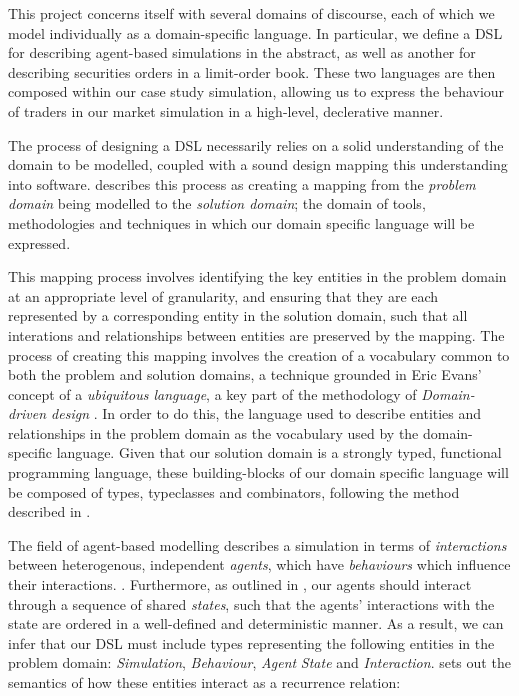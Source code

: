 \documentclass[a4paper, 11pt]{article}
\begin{document}
This project concerns itself with several domains of discourse, each of which we model individually as a domain-specific language. In particular, we define a DSL for describing agent-based simulations in the abstract, as well as another for describing securities orders in a limit-order book. These two languages are then composed within our case study simulation, allowing us to express the behaviour of traders in our market simulation in a high-level, declerative manner.

The process of designing a DSL necessarily relies on a solid understanding of the domain to be modelled, coupled with a sound design mapping this understanding into software. \cite{Ghosh2010} describes this process as creating a mapping from the \emph{problem domain} being modelled to the \emph{solution domain}; the domain of tools, methodologies and techniques in which our domain specific language will be expressed.

This mapping process involves identifying the key entities in the problem domain at an appropriate level of granularity, and ensuring that they are each represented by a corresponding entity in the solution domain, such that all interations and relationships between entities are preserved by the mapping. The process of creating this mapping involves the creation of a vocabulary common to both the problem and solution domains, a technique grounded in Eric Evans' concept of a \emph{ubiquitous language}, a key part of the methodology of \emph{Domain-driven design} \cite{Evans2004}. In order to do this, the language used to describe entities and relationships in the problem domain as the vocabulary used by the domain-specific language. Given that our solution domain is a strongly typed, functional programming language, these building-blocks of our domain specific language will be composed of types, typeclasses and combinators, following the method described in \cite{Jones2003a}.

The field of agent-based modelling describes a simulation in terms of \emph{interactions} between heterogenous, independent \emph{agents}, which have \emph{behaviours} which influence their interactions. \cite{Macal2010}. Furthermore, as outlined in \cite{Clack2011}, our agents should interact through a sequence of shared \emph{states}, such that the agents' interactions with the state are ordered in a well-defined and deterministic manner. As a result, we can infer that our DSL must include types representing the following entities in the problem domain: \emph{Simulation}, \emph{Behaviour}, \emph{Agent} \emph{State} and \emph{Interaction}. \cite{Clack2011} sets out the semantics of how these entities interact as a recurrence relation:
\end{document}
